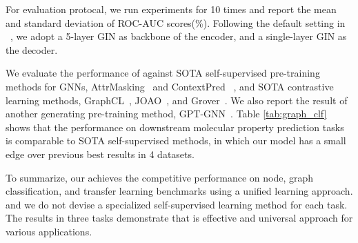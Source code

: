 {For evaluation protocal,  we run experiments for 10 times and report the mean and standard deviation of ROC-AUC scores(\%). Following the default setting in ~\cite{hu2020strategies},  we adopt a 5-layer GIN as backbone of the encoder, and a single-layer GIN as the decoder.


We evaluate the performance of \model against SOTA self-supervised pre-training methods for GNNs, AttrMasking~\cite{hu2020strategies} and ContextPred~\cite{hu2020strategies} , and SOTA contrastive learning methods, GraphCL~\cite{you2020graph}, JOAO~\cite{you2021graph}, and Grover~\cite{rong2020self}. We also report the result of another generating pre-training method, GPT-GNN~\cite{hu2020gpt}. Table \ref{tab:graph_clf} shows that the performance on downstream molecular property prediction tasks is comparable to SOTA self-supervised methods, in which our model has a small edge over previous best results in 4 datasets. 


To summarize, our \model achieves the competitive performance on node, graph classification, and transfer learning benchmarks using a unified learning approach. and we do not devise a specialized self-supervised learning method for each task. The results in three tasks demonstrate that \model is effective and universal approach for various applications. 












}
